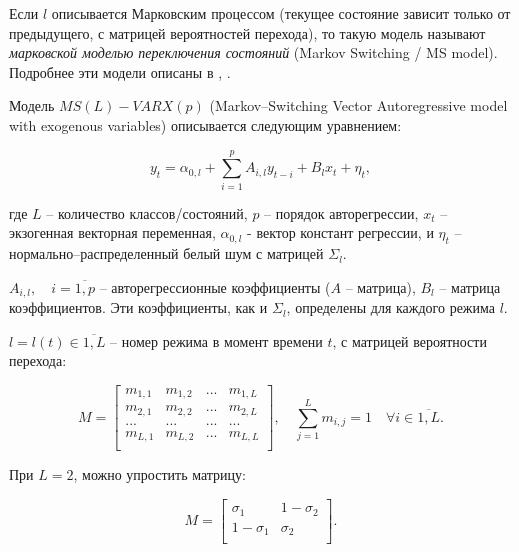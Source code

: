 \documentclass[a4paper,14pt]{extreport}
\begin{document}
	Если $l$ описывается Марковским процессом (текущее состояние зависит только от предыдущего, с матрицей вероятностей перехода), то такую модель называют \textit{марковской моделью переключения состояний} (Markov Switching / MS model). Подробнее эти модели описаны в \cite{malNovopMSVARX}, \cite{mal_methods_nonconstant}.
	
	Модель $MS(L)-VARX(p)$ (Markov–Switching Vector Autoregressive model with exogenous variables) описывается следующим уравнением:
	
	\begin{equation}
	y_{t} = \alpha_{0,l} + \sum_{i=1}^{p} A_{i,l} y_{t-i} + B_{l} x_{t} + \eta_{t},
	\end{equation}
	
	где $L$ – количество классов/состояний, $p$ – порядок авторегрессии, $x_{t}$ – экзогенная векторная переменная, $\alpha_{0,l}$ - вектор констант регрессии, и $\eta_{t}$ – нормально–распределенный белый шум с матрицей $\Sigma_{l}$.
	
	$A_{i,l}, \quad i = \overline{1,p} $ – авторегрессионные коэффициенты ($A$ – матрица), $B_{l}$ – матрица коэффициентов. Эти коэффициенты, как и $\Sigma_{l}$, определены для каждого режима $l$.
	
	$l=l(t) \in \overline{1,L}$ – номер режима в момент времени $t$, с матрицей вероятности перехода:
	
	\begin{equation}
	\label{eq:M_matrix}
	M=
	\left[ {\begin{array}{cccc}
		m_{1,1} & m_{1,2} & ... & m_{1,L} \\
		m_{2,1} & m_{2,2} & ... & m_{2,L} \\
		... & ... & ... & ... \\
		m_{L,1} & m_{L,2} & ... & m_{L,L} \\
		\end{array} } \right]
	, \quad
	\sum_{j=1}^{L} m_{i,j} = 1 \quad \forall i \in \overline{1,L}.
	\end{equation}
	
	При $L=2$, можно упростить матрицу:
	
	\begin{equation}
	\label{eq:M_simplified}
	M=
	\left[ {\begin{array}{cc}
		\sigma_{1} & 1-\sigma_{2} \\
		1-\sigma_{1} & \sigma_{2} \\
		\end{array} } \right].
	\end{equation}
	
\end{document}
